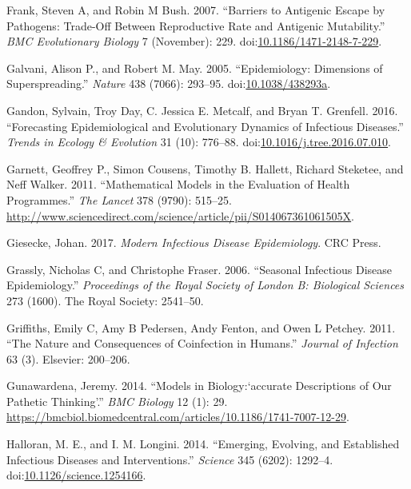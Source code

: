 \documentclass[]{article}
\theoremstyle{definition}
\theoremstyle{definition}
\theoremstyle{definition}
\theoremstyle{remark}
\begin{document}
\hypertarget{ref-frank07}{}
Frank, Steven A, and Robin M Bush. 2007. ``Barriers to Antigenic Escape
by Pathogens: Trade-Off Between Reproductive Rate and Antigenic
Mutability.'' \emph{BMC Evolutionary Biology} 7 (November): 229.
doi:\href{https://doi.org/10.1186/1471-2148-7-229}{10.1186/1471-2148-7-229}.

\hypertarget{ref-galvani05}{}
Galvani, Alison P., and Robert M. May. 2005. ``Epidemiology: Dimensions
of Superspreading.'' \emph{Nature} 438 (7066): 293--95.
doi:\href{https://doi.org/10.1038/438293a}{10.1038/438293a}.

\hypertarget{ref-gandon16}{}
Gandon, Sylvain, Troy Day, C. Jessica E. Metcalf, and Bryan T. Grenfell.
2016. ``Forecasting Epidemiological and Evolutionary Dynamics of
Infectious Diseases.'' \emph{Trends in Ecology \& Evolution} 31 (10):
776--88.
doi:\href{https://doi.org/10.1016/j.tree.2016.07.010}{10.1016/j.tree.2016.07.010}.

\hypertarget{ref-garnett11}{}
Garnett, Geoffrey P., Simon Cousens, Timothy B. Hallett, Richard
Steketee, and Neff Walker. 2011. ``Mathematical Models in the Evaluation
of Health Programmes.'' \emph{The Lancet} 378 (9790): 515--25.
\url{http://www.sciencedirect.com/science/article/pii/S014067361061505X}.

\hypertarget{ref-giesecke17}{}
Giesecke, Johan. 2017. \emph{Modern Infectious Disease Epidemiology}.
CRC Press.

\hypertarget{ref-grassly06}{}
Grassly, Nicholas C, and Christophe Fraser. 2006. ``Seasonal Infectious
Disease Epidemiology.'' \emph{Proceedings of the Royal Society of London
B: Biological Sciences} 273 (1600). The Royal Society: 2541--50.

\hypertarget{ref-griffiths11}{}
Griffiths, Emily C, Amy B Pedersen, Andy Fenton, and Owen L Petchey.
2011. ``The Nature and Consequences of Coinfection in Humans.''
\emph{Journal of Infection} 63 (3). Elsevier: 200--206.

\hypertarget{ref-gunawardena14}{}
Gunawardena, Jeremy. 2014. ``Models in Biology:`accurate Descriptions of
Our Pathetic Thinking'.'' \emph{BMC Biology} 12 (1): 29.
\url{https://bmcbiol.biomedcentral.com/articles/10.1186/1741-7007-12-29}.

\hypertarget{ref-halloran14}{}
Halloran, M. E., and I. M. Longini. 2014. ``Emerging, Evolving, and
Established Infectious Diseases and Interventions.'' \emph{Science} 345
(6202): 1292--4.
doi:\href{https://doi.org/10.1126/science.1254166}{10.1126/science.1254166}.
\end{document}
